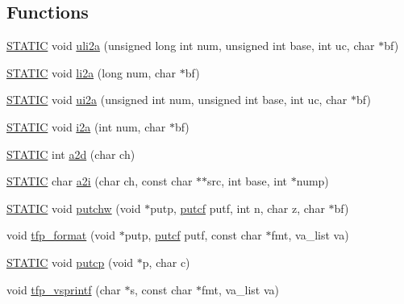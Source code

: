 \subsection*{Functions}
\begin{DoxyCompactItemize}
\item 
\hyperlink{a00043_a10b2d890d871e1489bb02b7e70d9bdfb}{S\+T\+A\+T\+I\+C} void \hyperlink{a00043_ac8448f6a2ace7b25fc6fbd5561fe5e75}{uli2a} (unsigned long int num, unsigned int base, int uc, char $\ast$bf)
\item 
\hyperlink{a00043_a10b2d890d871e1489bb02b7e70d9bdfb}{S\+T\+A\+T\+I\+C} void \hyperlink{a00043_a3e55a1e7928695ff7713544a808c3fce}{li2a} (long num, char $\ast$bf)
\item 
\hyperlink{a00043_a10b2d890d871e1489bb02b7e70d9bdfb}{S\+T\+A\+T\+I\+C} void \hyperlink{a00043_ae17e69308453bdacaa3b6475d441aa7b}{ui2a} (unsigned int num, unsigned int base, int uc, char $\ast$bf)
\item 
\hyperlink{a00043_a10b2d890d871e1489bb02b7e70d9bdfb}{S\+T\+A\+T\+I\+C} void \hyperlink{a00043_a13e43d9a7f9f5fedcc3889ed0dfe1cad}{i2a} (int num, char $\ast$bf)
\item 
\hyperlink{a00043_a10b2d890d871e1489bb02b7e70d9bdfb}{S\+T\+A\+T\+I\+C} int \hyperlink{a00043_a0f3bca7da68487662b7dff4aa60e2079}{a2d} (char ch)
\item 
\hyperlink{a00043_a10b2d890d871e1489bb02b7e70d9bdfb}{S\+T\+A\+T\+I\+C} char \hyperlink{a00043_aeadd3398ed3a27d05fd6638133feb559}{a2i} (char ch, const char $\ast$$\ast$src, int base, int $\ast$nump)
\item 
\hyperlink{a00043_a10b2d890d871e1489bb02b7e70d9bdfb}{S\+T\+A\+T\+I\+C} void \hyperlink{a00043_a231c14785d57435ad9cba03d6623c75c}{putchw} (void $\ast$putp, \hyperlink{a00043_aa2de12079c58c63cb0208a0b3df2a0b7}{putcf} putf, int n, char z, char $\ast$bf)
\item 
void \hyperlink{a00043_a2e6857db4b5af96ebbfa61da86245dc5}{tfp\+\_\+format} (void $\ast$putp, \hyperlink{a00043_aa2de12079c58c63cb0208a0b3df2a0b7}{putcf} putf, const char $\ast$fmt, va\+\_\+list va)
\item 
\hyperlink{a00043_a10b2d890d871e1489bb02b7e70d9bdfb}{S\+T\+A\+T\+I\+C} void \hyperlink{a00043_af8c19e7fd316d83ac94d9bed9fccbf76}{putcp} (void $\ast$p, char c)
\item 
void \hyperlink{a00043_aa8dfc5ac91747032198002a008a6aa46}{tfp\+\_\+vsprintf} (char $\ast$s, const char $\ast$fmt, va\+\_\+list va)
\end{DoxyCompactItemize}


